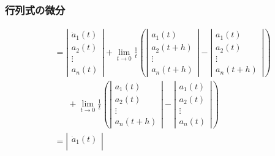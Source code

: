 \documentclass[10pt,hyperref={unicode}]{beamer}
\newcommand{\absolute}[1]{\left|#1\right|}
\newcommand{\parentheses}[1]{\left(#1\right)}
\begin{document}
\begin{frame}
\frametitle{行列式の微分}
\begin{align*}
    &= \absolute{%
            \begin{array}{c}
                \dot{a}_1\parentheses{t} \\
                a_2\parentheses{t} \\
                \vdots \\
                a_n\parentheses{t}
            \end{array}
    } + \lim_{t \to 0}\frac{1}{t}
    \parentheses{%
        \absolute{%
            \begin{array}{c}
                a_1\parentheses{t} \\
                a_2\parentheses{t + h} \\
                \vdots \\
                a_n\parentheses{t + h}
            \end{array}
        }
        -
        \absolute{%
            \begin{array}{c}
                a_1\parentheses{t} \\
                a_2\parentheses{t} \\
                \vdots \\
                a_n\parentheses{t + h}
            \end{array}
        }
    } \\
    &\phantom{=}\ + \lim_{t \to 0}\frac{1}{t}
    \parentheses{%
        \absolute{%
            \begin{array}{c}
                a_1\parentheses{t} \\
                a_2\parentheses{t} \\
                \vdots \\
                a_n\parentheses{t + h}
            \end{array}
        }
        -
        \absolute{%
            \begin{array}{c}
                a_1\parentheses{t} \\
                a_2\parentheses{t} \\
                \vdots \\
                a_n\parentheses{t}
            \end{array}
        }
    } \\
    &=
    \absolute{%
            \begin{array}{c}
                \dot{a}_1\parentheses{t} \\

\end{array}}
\end{align*}
\end{frame}
\end{document}
